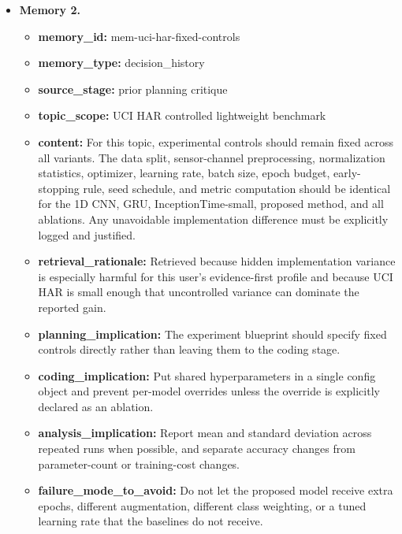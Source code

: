 \documentclass{opendatalab}
\begin{document}
\begin{tcolorbox}
\begin{itemize}
  \item \textbf{Memory 2.}
  \begin{itemize}\setlength\itemsep{1pt}
    \item \textbf{memory\_id:} mem-uci-har-fixed-controls
    \item \textbf{memory\_type:} decision\_history
    \item \textbf{source\_stage:} prior planning critique
    \item \textbf{topic\_scope:} UCI HAR controlled lightweight benchmark
    \item \textbf{content:} For this topic, experimental controls should remain fixed across all variants. The data split, sensor-channel preprocessing, normalization statistics, optimizer, learning rate, batch size, epoch budget, early-stopping rule, seed schedule, and metric computation should be identical for the 1D CNN, GRU, InceptionTime-small, proposed method, and all ablations. Any unavoidable implementation difference must be explicitly logged and justified.
    \item \textbf{retrieval\_rationale:} Retrieved because hidden implementation variance is especially harmful for this user's evidence-first profile and because UCI HAR is small enough that uncontrolled variance can dominate the reported gain.
    \item \textbf{planning\_implication:} The experiment blueprint should specify fixed controls directly rather than leaving them to the coding stage.
    \item \textbf{coding\_implication:} Put shared hyperparameters in a single config object and prevent per-model overrides unless the override is explicitly declared as an ablation.
    \item \textbf{analysis\_implication:} Report mean and standard deviation across repeated runs when possible, and separate accuracy changes from parameter-count or training-cost changes.
    \item \textbf{failure\_mode\_to\_avoid:} Do not let the proposed model receive extra epochs, different augmentation, different class weighting, or a tuned learning rate that the baselines do not receive.
  \end{itemize}


\end{itemize}
\end{tcolorbox}
\end{document}
